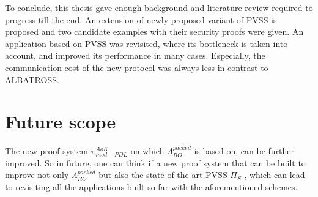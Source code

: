 To conclude, this thesis gave enough background and literature review required to 
progress till the end. An extension of newly proposed variant of PVSS is proposed and 
two candidate examples with their security proofs were given. An application based on PVSS 
was revisited, where its bottleneck is taken into account, and improved its performance 
in many cases. Especially, the communication cost of the new protocol was always less in 
contrast to ALBATROSS.

\section*{Future scope}
The new proof system $\pi_{mod-PDL}^{AoK}$ on which $\Lambda_{RO}^{packed}$ is based on, 
can be further improved. So in future, one can think if a new proof system that can be built 
to improve not only $\Lambda_{RO}^{packed}$ but also the state-of-the-art PVSS $\Pi_{S}$ \cite{cryptoeprint:2023/1669}, 
which can lead to revisiting all the applications built so far with the aforementioned schemes.

